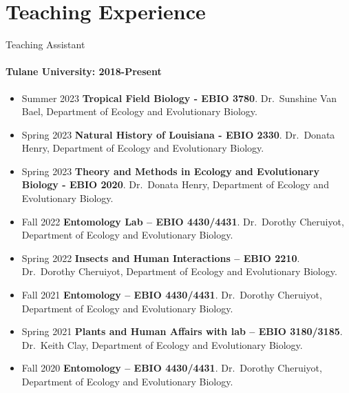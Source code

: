 \documentclass[11pt,a4paper,]{awesome-cv}
\begin{document}
\hypertarget{teaching-experience}{%
\section{Teaching Experience}\label{teaching-experience}}

Teaching Assistant

\hypertarget{tulane-university-2018-present}{%
\paragraph{Tulane University:
2018-Present}\label{tulane-university-2018-present}}

\begin{itemize}
\item
  Summer 2023 \textbar{} \textbf{Tropical Field Biology - EBIO 3780}.
  Dr.~Sunshine Van Bael, Department of Ecology and Evolutionary
  Biology.\\
\item
  Spring 2023 \textbar{} \textbf{Natural History of Louisiana - EBIO
  2330}. Dr.~Donata Henry, Department of Ecology and Evolutionary
  Biology.\\
\item
  Spring 2023 \textbar{} \textbf{Theory and Methods in Ecology and
  Evolutionary Biology - EBIO 2020}. Dr.~Donata Henry, Department of
  Ecology and Evolutionary Biology.\\
\item
  Fall 2022 \textbar{} \textbf{Entomology Lab -- EBIO 4430/4431}.
  Dr.~Dorothy Cheruiyot, Department of Ecology and Evolutionary
  Biology.\\
\item
  Spring 2022 \textbar{} \textbf{Insects and Human Interactions -- EBIO
  2210}. Dr.~Dorothy Cheruiyot, Department of Ecology and Evolutionary
  Biology.\\
\item
  Fall 2021 \textbar{} \textbf{Entomology -- EBIO 4430/4431}.
  Dr.~Dorothy Cheruiyot, Department of Ecology and Evolutionary
  Biology.\\
\item
  Spring 2021 \textbar{} \textbf{Plants and Human Affairs with lab --
  EBIO 3180/3185}. Dr.~Keith Clay, Department of Ecology and
  Evolutionary Biology.\\
\item
  Fall 2020 \textbar{} \textbf{Entomology -- EBIO 4430/4431}.
  Dr.~Dorothy Cheruiyot, Department of Ecology and Evolutionary
  Biology.\\

\end{itemize}
\end{document}
